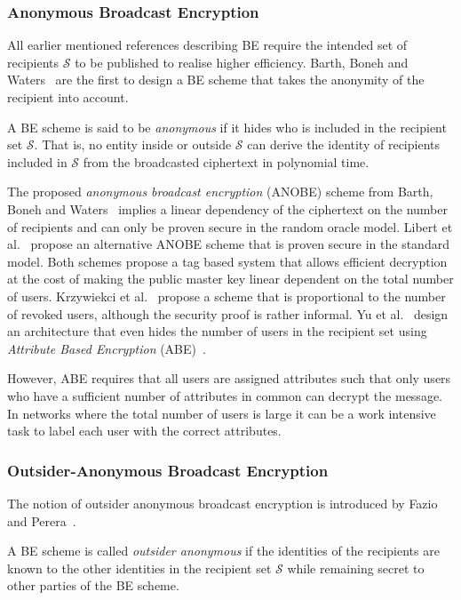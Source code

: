 \subsubsection{Anonymous Broadcast Encryption}
\label{sec:anobe}
All earlier mentioned references describing BE require the intended set of recipients $\mathcal{S}$ to be published to realise higher efficiency. Barth, Boneh and Waters~\cite{art:BarthBW06} are the first to design a BE scheme that takes the anonymity of the recipient into account.
\begin{defn}[Anonymity]
\label{def:anonymity}
 A BE scheme is said to be \textit{anonymous} if it hides who is included in the recipient set $\mathcal{S}$. That is, no entity inside or outside $\mathcal{S}$ can derive the identity of recipients included in $\mathcal{S}$ from the broadcasted ciphertext in polynomial time.
\end{defn}

The proposed \textit{anonymous broadcast encryption} (ANOBE) scheme from Barth, Boneh and Waters~\cite{art:BarthBW06} implies a linear dependency of the ciphertext on the number of recipients and can only be proven secure in the random oracle model. Libert et al.~\cite{art:LibertPQ12}  propose an alternative ANOBE scheme that is proven secure in the standard model. Both schemes propose a tag based system that allows efficient decryption at the cost of making the public master key linear dependent on the total number of users. Krzywiekci et al.~\cite{art:KrzywieckiKK06} propose a scheme that is proportional to the number of revoked users, although the security proof is rather informal. Yu et al.~\cite{art:YuRL10} design an architecture that even hides the number of users in the recipient set using \textit{Attribute Based Encryption} (ABE)~\cite{art:SahaiW04}.

However, ABE requires that all users are assigned attributes such that only users who have a sufficient number of attributes in common can decrypt the message. In networks where the total number of users is large it can be a work intensive task to label each user with the correct attributes.

\subsubsection{Outsider-Anonymous Broadcast Encryption}
The notion of outsider anonymous broadcast encryption is introduced by Fazio and Perera~\cite{art:FazioP12}.
\begin{defn}
\label{def:outsider_anonymity}
 A BE scheme is called \textit{outsider anonymous} if the identities of the recipients are known to the other identities in the recipient set $\mathcal{S}$ while remaining secret to other parties of the BE scheme.
\end{defn}

